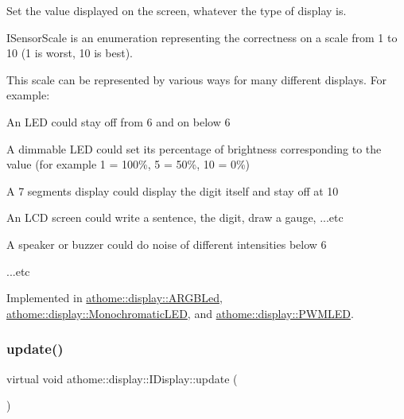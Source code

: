 Set the value displayed on the screen, whatever the type of display is.

I\+Sensor\+Scale is an enumeration representing the correctness on a scale from 1 to 10 (1 is worst, 10 is best).

This scale can be represented by various ways for many different displays. For example\+:


\begin{DoxyItemize}
\item An L\+ED could stay off from 6 and on below 6
\item A dimmable L\+ED could set it\textquotesingle{}s percentage of brightness corresponding to the value (for example 1 = 100\%, 5 = 50\%, 10 = 0\%)
\item A 7 segments display could display the digit itself and stay off at 10
\item An L\+CD screen could write a sentence, the digit, draw a gauge, ...etc
\item A speaker or buzzer could do noise of different intensities below 6
\item ...etc 
\end{DoxyItemize}

Implemented in \mbox{\hyperlink{classathome_1_1display_1_1_a_r_g_b_led_a1e6a934912f71a5ea06df1d28cf5ace9}{athome\+::display\+::\+A\+R\+G\+B\+Led}}, \mbox{\hyperlink{classathome_1_1display_1_1_monochromatic_l_e_d_a67a39b7d73305a98fc25705dcc5f3cd0}{athome\+::display\+::\+Monochromatic\+L\+ED}}, and \mbox{\hyperlink{classathome_1_1display_1_1_p_w_m_l_e_d_a8cde32d9aa5b28dfbc79e2677bfce921}{athome\+::display\+::\+P\+W\+M\+L\+ED}}.

\mbox{\label{classathome_1_1display_1_1_i_display_a4ba7bd5d46f88578f1c846f4f5f3c5d1}} 
\subsubsection{\texorpdfstring{update()}{update()}}
{\footnotesize\ttfamily virtual void athome\+::display\+::\+I\+Display\+::update (\begin{DoxyParamCaption}{ }\end{DoxyParamCaption})\hspace{0.3cm}{\ttfamily [pure virtual]}}

